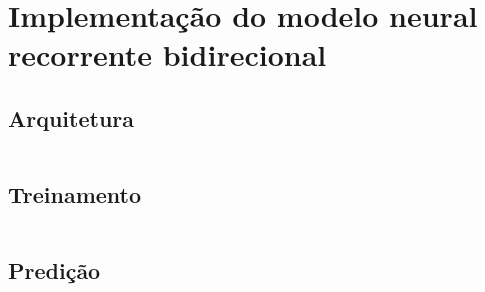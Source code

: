 \begin{apendicesenv}
\inputminted[linenos,fontsize=\scriptsize]{python}{postextuais/recursive_model_predict.py}


\chapter{Implementação do modelo neural recorrente bidirecional} \label{app:implementacaorecorrentebidir}

\section{Arquitetura}

\inputminted[linenos,fontsize=\scriptsize]{python}{postextuais/recurrent_model_network.py}

\section{Treinamento}

\inputminted[linenos,fontsize=\scriptsize]{python}{postextuais/recurrent_model_train.py}

\section{Predição}

\inputminted[linenos,fontsize=\scriptsize]{python}{postextuais/recurrent_model_predict.py}


\end{apendicesenv}
